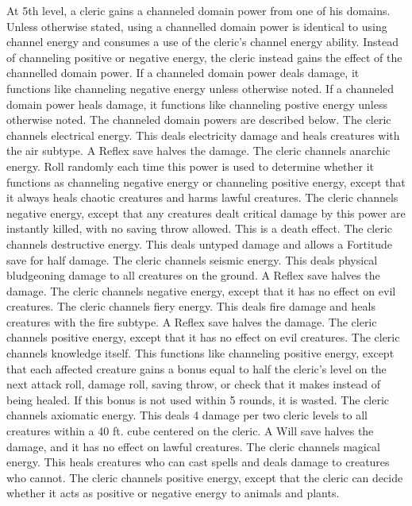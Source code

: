  At 5th level, a cleric gains a channeled domain power from one of his domains. Unless otherwise stated, using a channelled domain power is identical to using channel energy and consumes a use of the cleric's channel energy ability. Instead of channeling positive or negative energy, the cleric instead gains the effect of the channelled domain power. If a channeled domain power deals damage, it functions like channeling negative energy unless otherwise noted. If a channeled domain power heals damage, it functions like channeling postive energy unless otherwise noted. The channeled domain powers are described below.
 The cleric channels electrical energy. This deals electricity damage and heals creatures with the air subtype. A Reflex save halves the damage.
 The cleric channels anarchic energy. Roll randomly each time this power is used to determine whether it functions as channeling negative energy or channeling positive energy, except that it always heals chaotic creatures and harms lawful creatures.
 The cleric channels negative energy, except that any creatures dealt critical damage by this power are instantly killed, with no saving throw allowed. This is a death effect.
 The cleric channels destructive energy. This deals untyped damage and allows a Fortitude save for half damage.
 The cleric channels seismic energy. This deals physical bludgeoning damage to all creatures on the ground. A Reflex save halves the damage.
 The cleric channels negative energy, except that it has no effect on evil creatures.
 The cleric channels fiery energy. This deals fire damage and heals creatures with the fire subtype. A Reflex save halves the damage.
 The cleric channels positive energy, except that it has no effect on evil creatures.
 The cleric channels knowledge itself. This functions like channeling positive energy, except that each affected creature gains a bonus equal to half the cleric's level on the next attack roll, damage roll, saving throw, or check that it makes instead of being healed. If this bonus is not used within 5 rounds, it is wasted.
 The cleric channels axiomatic energy. This deals 4 damage per two cleric levels to all creatures within a 40 ft. cube centered on the cleric. A Will save halves the damage, and it has no effect on lawful creatures.
 The cleric channels magical energy. This heals creatures who can cast spells and deals damage to creatures who cannot.
 The cleric channels positive energy, except that the cleric can decide whether it acts as positive or negative energy to animals and plants.
